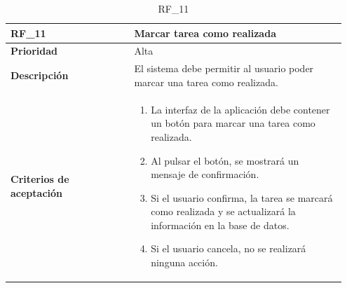 \begin{table}[htb!]
    \begin{tabular}{|p{0.35\linewidth}|p{0.6\linewidth}|}
        \hline
        \rowcolor[HTML]{C0C0C0}  
        \textbf{RF\_11} & \textbf{Marcar tarea como realizada} \\
        \hline
        \textbf{Prioridad} & Alta \\
        \hline
        \textbf{Descripción} & El sistema debe permitir al usuario poder marcar una tarea como realizada.  \\
        \hline
        \vspace{0.5mm}
        \textbf{Criterios de aceptación} & 
        \begin{minipage}[t]{0.9\linewidth}
            \begin{enumerate}
                \item La interfaz de la aplicación debe contener un botón para marcar una tarea como realizada.
                \item Al pulsar el botón, se mostrará un mensaje de confirmación.
                \item Si el usuario confirma, la tarea se marcará como realizada y se actualizará la información en la base de datos.
                \item Si el usuario cancela, no se realizará ninguna acción.
            \end{enumerate}
            \vspace{2mm}
        \end{minipage} \\
        \hline
    \end{tabular}
    \caption{RF\_11}

\end{table}


